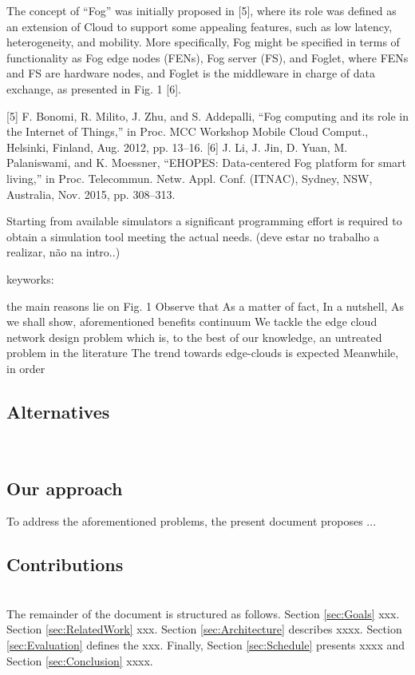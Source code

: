 The concept of “Fog” was initially proposed in [5], where
its role was defined as an extension of Cloud to support some
appealing features, such as low latency, heterogeneity, and
mobility. More specifically, Fog might be specified in terms
of functionality as Fog edge nodes (FENs), Fog server (FS),
and Foglet, where FENs and FS are hardware nodes, and
Foglet is the middleware in charge of data exchange, as
presented in Fig. 1 [6].

[5] F. Bonomi, R. Milito, J. Zhu, and S. Addepalli, “Fog computing and its
role in the Internet of Things,” in Proc. MCC Workshop Mobile Cloud
Comput., Helsinki, Finland, Aug. 2012, pp. 13–16.
[6] J. Li, J. Jin, D. Yuan, M. Palaniswami, and K. Moessner, “EHOPES:
Data-centered Fog platform for smart living,” in Proc. Telecommun.
Netw. Appl. Conf. (ITNAC), Sydney, NSW, Australia, Nov. 2015,
pp. 308–313.


Starting from available simulators a significant programming
effort is required to obtain a simulation tool meeting the actual
needs. (deve estar no trabalho a realizar, não na intro..)

keyworks:

the main reasons lie on Fig. 1
Observe that
As a matter of fact,
In a nutshell,
As we shall show,
aforementioned benefits
continuum
We tackle the edge cloud network design problem
which is, to the best of our knowledge, an untreated problem in the literature
The trend towards edge-clouds is expected
Meanwhile, in order



\subsection{Alternatives}
\noindent\tab [Alternatives]\\

\subsection{Our approach}
\noindent\tab To address the aforementioned problems, the present document proposes ...\\

\subsection{Contributions}
\noindent\tab [Contributions]\\
\noindent\tab The remainder of the document is structured as follows. Section \ref{sec:Goals} xxx. Section \ref{sec:RelatedWork} xxx. Section \ref{sec:Architecture} describes xxxx. Section \ref{sec:Evaluation} defines the xxx. Finally, Section \ref{sec:Schedule} presents xxxx and Section \ref{sec:Conclusion} xxxx.



